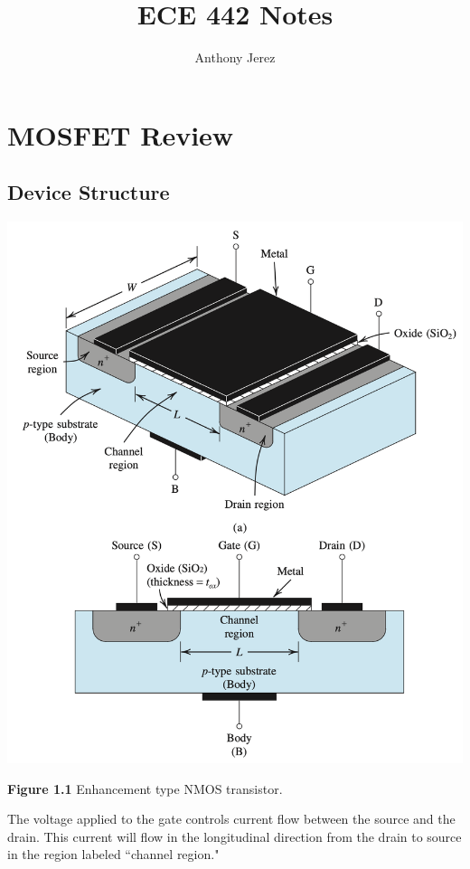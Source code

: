 \documentclass[12pt]{article}
\title{ECE 442 Notes}
\author{Anthony Jerez}
\begin{document}
    \maketitle
    \setlength{\parindent}{0pt}

    \section{MOSFET Review}

    \subsection*{Device Structure}

    \begin{center}
        \centerline{\includegraphics[scale=0.4]{figures/mosfet.png}}
        \textbf{Figure 1.1} Enhancement type NMOS transistor.
    \end{center}

    The voltage applied to the gate controls current flow between the source
    and the drain. This current will flow in the longitudinal direction from 
    the drain to source in the region labeled “channel region."
\end{document}
